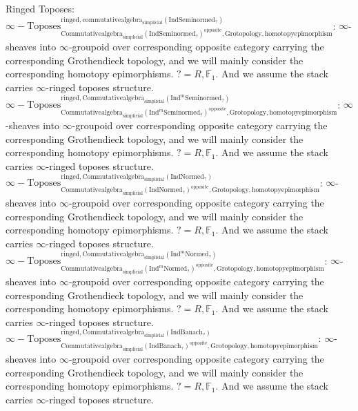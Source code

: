 \documentclass[11pt]{book}
\theoremstyle{definition}
\numberwithin{equation}{section}
\begin{document}
 
\noindent Ringed Toposes: \\
 
 \noindent $\infty-\mathrm{Toposes}^{\mathrm{ringed},\mathrm{commutativealgebra}_{\mathrm{simplicial}}(\mathrm{Ind}\mathrm{Seminormed}_?)}_{\mathrm{Commutativealgebra}_{\mathrm{simplicial}}(\mathrm{Ind}\mathrm{Seminormed}_?)^\mathrm{opposite},\mathrm{Grotopology,homotopyepimorphism}}$: $\infty$-sheaves into $\infty$-groupoid over corresponding opposite category carrying the corresponding Grothendieck topology, and we will mainly consider the corresponding homotopy epimorphisms. $?=R,\mathbb{F}_1$. And we assume the stack carries $\infty$-ringed toposes structure. \\
\noindent $\infty-\mathrm{Toposes}^{\mathrm{ringed},\mathrm{Commutativealgebra}_{\mathrm{simplicial}}(\mathrm{Ind}^m\mathrm{Seminormed}_?)}_{\mathrm{Commutativealgebra}_{\mathrm{simplicial}}(\mathrm{Ind}^m\mathrm{Seminormed}_?)^\mathrm{opposite},\mathrm{Grotopology,homotopyepimorphism}}$: $\infty$-sheaves into $\infty$-groupoid over corresponding opposite category carrying the corresponding Grothendieck topology, and we will mainly consider the corresponding homotopy epimorphisms. $?=R,\mathbb{F}_1$. And we assume the stack carries $\infty$-ringed toposes structure.\\
\noindent $\infty-\mathrm{Toposes}^{\mathrm{ringed},\mathrm{Commutativealgebra}_{\mathrm{simplicial}}(\mathrm{Ind}\mathrm{Normed}_?)}_{\mathrm{Commutativealgebra}_{\mathrm{simplicial}}(\mathrm{Ind}\mathrm{Normed}_?)^\mathrm{opposite},\mathrm{Grotopology,homotopyepimorphism}}$: $\infty$-sheaves into $\infty$-groupoid over corresponding opposite category carrying the corresponding Grothendieck topology, and we will mainly consider the corresponding homotopy epimorphisms. $?=R,\mathbb{F}_1$. And we assume the stack carries $\infty$-ringed toposes structure.\\
\noindent $\infty-\mathrm{Toposes}^{\mathrm{ringed},\mathrm{Commutativealgebra}_{\mathrm{simplicial}}(\mathrm{Ind}^m\mathrm{Normed}_?)}_{\mathrm{Commutativealgebra}_{\mathrm{simplicial}}(\mathrm{Ind}^m\mathrm{Normed}_?)^\mathrm{opposite},\mathrm{Grotopology,homotopyepimorphism}}$: $\infty$-sheaves into $\infty$-groupoid over corresponding opposite category carrying the corresponding Grothendieck topology, and we will mainly consider the corresponding homotopy epimorphisms. $?=R,\mathbb{F}_1$. And we assume the stack carries $\infty$-ringed toposes structure.\\
\noindent $\infty-\mathrm{Toposes}^{\mathrm{ringed},\mathrm{Commutativealgebra}_{\mathrm{simplicial}}(\mathrm{Ind}\mathrm{Banach}_?)}_{\mathrm{Commutativealgebra}_{\mathrm{simplicial}}(\mathrm{Ind}\mathrm{Banach}_?)^\mathrm{opposite},\mathrm{Grotopology,homotopyepimorphism}}$: $\infty$-sheaves into $\infty$-groupoid over corresponding opposite category carrying the corresponding Grothendieck topology, and we will mainly consider the corresponding homotopy epimorphisms. $?=R,\mathbb{F}_1$. And we assume the stack carries $\infty$-ringed toposes structure.\\
\end{document}

